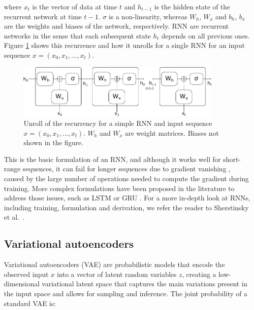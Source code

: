 where $x_t$ is the vector of data at time $t$ and $h_{t-1}$ is the hidden state of the recurrent network at time $t-1$. $\sigma$ is a non-linearity, whereas $W_h$, $W_x$ and $b_h$, $b_x$ are the weights and biases of the network, respectively. RNN are recurrent networks in the sense that each subsequent state $h_t$ depends on all previous ones. Figure \ref{fig:rnnvae:rnn} shows this recurrence and how it unrolls for a single RNN for an input sequence $x = (x_0,x_1, ..., x_t)$. \\

\begin{figure}[!htbp]
  \centering
  \includegraphics[width=0.9\textwidth]{figures/rnnvae/rnn-fig.pdf}
  \caption[Unroll of the recurrency for a basic RNN.]{Unroll of the recurrency for a simple RNN and input sequence $x = (x_0,x_1, ..., x_t)$. $W_h$ and $W_x$ are weight matrices. Biases not shown in the figure.}\label{fig:rnnvae:rnn}
\end{figure}

This is the basic formulation of an RNN, and although it works well for short-range sequences, it can fail for longer sequences due to gradient vanishing \cite{Hochreiter1998}, caused by the large number of operations needed to compute the gradient during training. More complex formulations have been proposed in the literature to address those issues, such as LSTM \cite{Hochreiter1997} or GRU \cite{Chung2014}. For a more in-depth look at RNNs, including training, formulation and derivation, we refer the reader to Sherstinsky et al.\ \cite{Sherstinsky2020}.  \\

\subsection{Variational autoencoders}

Variational autoencoders (VAE) are probabilistic models that encode the observed input $x$ into a vector of latent random variables $z$, creating a low-dimensional variational latent space that captures the main variations present in the input space and allows for sampling and inference. The joint probability of a standard VAE is:

